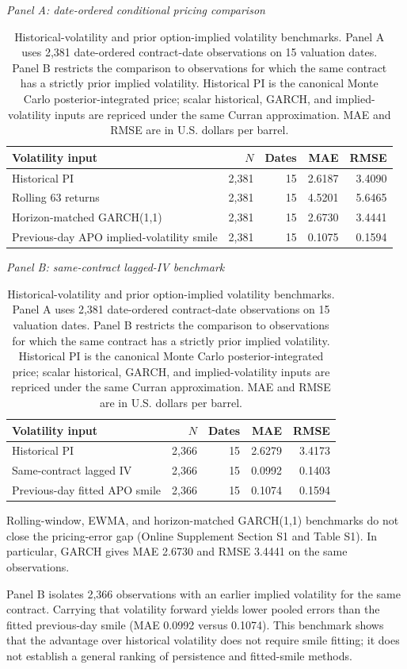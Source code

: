 \begin{table}[t]
\centering
\caption{Historical-volatility and prior option-implied volatility benchmarks. Panel A uses 2,381 date-ordered contract-date observations on 15 valuation dates. Panel B restricts the comparison to observations for which the same contract has a strictly prior implied volatility. Historical PI is the canonical Monte Carlo posterior-integrated price; scalar historical, GARCH, and implied-volatility inputs are repriced under the same Curran approximation. MAE and RMSE are in U.S. dollars per barrel.}\label{tab:short_forward}

\textit{Panel A: date-ordered conditional pricing comparison}\\[2pt]
\begin{tabular}{lrrrr}
\toprule
Volatility input & $N$ & Dates & MAE & RMSE\\
\midrule
Historical PI & 2,381 & 15 & 2.6187 & 3.4090\\
Rolling 63 returns & 2,381 & 15 & 4.5201 & 5.6465\\
Horizon-matched GARCH(1,1) & 2,381 & 15 & 2.6730 & 3.4441\\
Previous-day APO implied-volatility smile & 2,381 & 15 & 0.1075 & 0.1594\\
\bottomrule
\end{tabular}

\vspace{5pt}
\textit{Panel B: same-contract lagged-IV benchmark}\\[2pt]
\begin{tabular}{lrrrr}
\toprule
Volatility input & $N$ & Dates & MAE & RMSE\\
\midrule
Historical PI & 2,366 & 15 & 2.6279 & 3.4173\\
Same-contract lagged IV & 2,366 & 15 & 0.0992 & 0.1403\\
Previous-day fitted APO smile & 2,366 & 15 & 0.1074 & 0.1594\\
\bottomrule
\end{tabular}
\end{table}

Rolling-window, EWMA, and horizon-matched GARCH(1,1) benchmarks do not close the pricing-error gap (Online Supplement Section S1 and Table S1). In particular, GARCH gives MAE 2.6730 and RMSE 3.4441 on the same observations.

Panel B isolates 2,366 observations with an earlier implied volatility for the same contract. Carrying that volatility forward yields lower pooled errors than the fitted previous-day smile (MAE 0.0992 versus 0.1074). This benchmark shows that the advantage over historical volatility does not require smile fitting; it does not establish a general ranking of persistence and fitted-smile methods.

